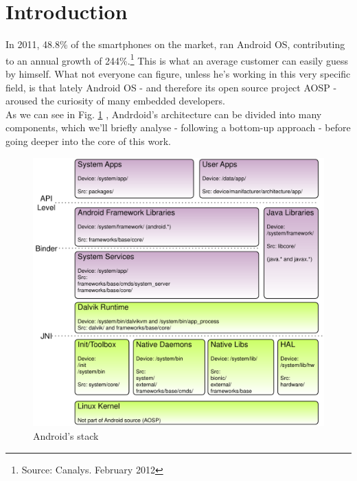 
\section{Introduction}
In 2011, 48.8\% of the smartphones on the market, ran Android OS, contributing to an annual growth of 244\%.\footnote{Source: Canalys. February 2012} This is what an average customer can easily guess by himself. What not everyone can figure, unless he's working in this very specific field, is that lately Android OS - and therefore its open source project AOSP - aroused the curiosity of many embedded developers.\\
As we can see in Fig. \ref{fig:stack} \cite{remixingand}, Andrdoid's architecture can be divided into many components, which we'll briefly analyse - following a bottom-up approach - before going deeper into the core of this work.
\begin{figure}[!htb]
	\centering
	\includegraphics[scale=.6]{images/stack.pdf}
	\caption{Android's stack}
	\label{fig:stack}
\end{figure}
